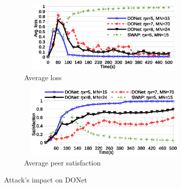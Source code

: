 \begin{figure}[tb]
  \centering
  \begin{subfigure}[c]{0.95\columnwidth}
    \centering
    \includegraphics[width=8.4cm,height=3.5cm]{./Figures/avg-loss-donet.eps}
    \caption{Average loss}%
    \label{subfig:avg-loss-donet}
  \end{subfigure}
  \begin{subfigure}[c]{0.95\columnwidth}
    \centering
    \includegraphics[width=8.4cm,height=3.5cm]{./Figures/satisfaction-donet.eps}
    \caption{Average peer satisfaction}%
    \label{subfig:satisfaction-donet}
  \end{subfigure}
  \caption{Attack's impact on DONet}%
  \label{fig:attack-results}
  \vspace{-4mm}
\end{figure}

% 
% 
% 
% 
% 

